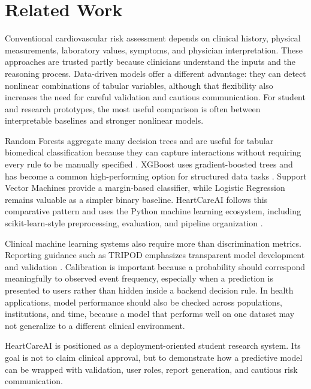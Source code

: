\documentclass[conference]{IEEEtran}
\begin{document}
\section{Related Work}
Conventional cardiovascular risk assessment depends on clinical history, physical measurements, laboratory values, symptoms, and physician interpretation. These approaches are trusted partly because clinicians understand the inputs and the reasoning process. Data-driven models offer a different advantage: they can detect nonlinear combinations of tabular variables, although that flexibility also increases the need for careful validation and cautious communication. For student and research prototypes, the most useful comparison is often between interpretable baselines and stronger nonlinear models.

Random Forests aggregate many decision trees and are useful for tabular biomedical classification because they can capture interactions without requiring every rule to be manually specified \cite{breiman_rf}. XGBoost uses gradient-boosted trees and has become a common high-performing option for structured data tasks \cite{chen_xgboost}. Support Vector Machines provide a margin-based classifier, while Logistic Regression remains valuable as a simpler binary baseline. HeartCareAI follows this comparative pattern and uses the Python machine learning ecosystem, including scikit-learn-style preprocessing, evaluation, and pipeline organization \cite{scikit_learn}.

Clinical machine learning systems also require more than discrimination metrics. Reporting guidance such as TRIPOD emphasizes transparent model development and validation \cite{tripod}. Calibration is important because a probability should correspond meaningfully to observed event frequency, especially when a prediction is presented to users rather than hidden inside a backend decision rule. In health applications, model performance should also be checked across populations, institutions, and time, because a model that performs well on one dataset may not generalize to a different clinical environment.

HeartCareAI is positioned as a deployment-oriented student research system. Its goal is not to claim clinical approval, but to demonstrate how a predictive model can be wrapped with validation, user roles, report generation, and cautious risk communication.
\end{document}
